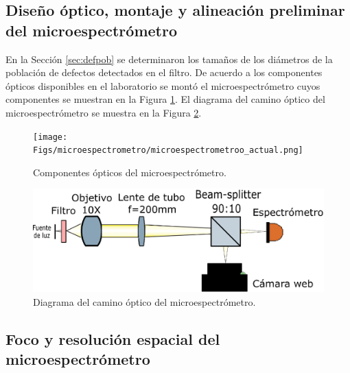 
\singlespacing
\subsection{Diseño óptico, montaje y alineación preliminar del microespectrómetro}
\label{sec:montalin}

\hspace{0.5cm}En la Sección \ref{sec:defpob} se determinaron los tamaños de los diámetros de la población de defectos detectados en el filtro. De acuerdo a los componentes ópticos disponibles en el laboratorio se montó el microespectrómetro cuyos componentes se muestran en la Figura \ref{fig:micromfinal}. El diagrama del camino óptico del microespectrómetro se muestra en la Figura \ref{fig:diagcaminoopt}.
\begin{figure}[H]
	\centering
	\texttt{[image: Figs/microespectrometro/microespectrometroo\_actual.png]}
	\caption{Componentes ópticos del microespectrómetro.}
	\label{fig:micromfinal}
\end{figure}

\begin{figure}[H]
	\centering
	\includegraphics[width=1.0\textwidth]{Figs/microespectrometro/diagopticosetup.png}
	\caption{Diagrama del camino óptico del microespectrómetro.}
	\label{fig:diagcaminoopt}
\end{figure}





\singlespacing
\subsection{Foco y resolución espacial del microespectrómetro}
\label{sec:focoresol}

